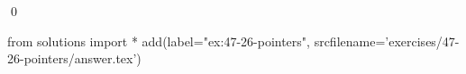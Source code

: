 
\begin{ex}
  \label{ex:47-26-pointers}
  
  \qed
\end{ex}
\begin{python0}
from solutions import *
add(label="ex:47-26-pointers",
    srcfilename='exercises/47-26-pointers/answer.tex')
\end{python0}
